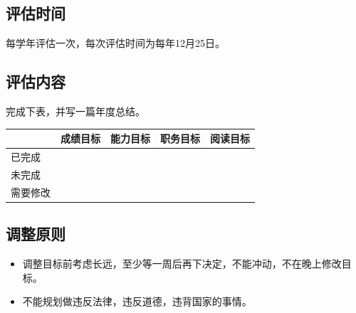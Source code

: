 \documentclass{article}
\begin{document}
\subsection{评估时间}
每学年评估一次，每次评估时间为每年12月25日。\par
\subsection{评估内容}
完成下表，并写一篇年度总结。\par
\begin{table}[h]
	\centering
	\begin{tabular}{|l|l|l|l|l|}
		\hline
		& \textbf{成绩目标} & \textbf{能力目标} & \textbf{职务目标} & \textbf{阅读目标} \\ \hline
		已完成  &               &               &               &               \\ \hline
		未完成  &               &               &               &               \\ \hline
		需要修改 &               &               &               &               \\ \hline
	\end{tabular}
\end{table}
\subsection{调整原则}
\begin{itemize}
	\item 调整目标前考虑长远，至少等一周后再下决定，不能冲动，不在晚上修改目标。
	\item 不能规划做违反法律，违反道德，违背国家的事情。
\end{itemize}
\end{document}
